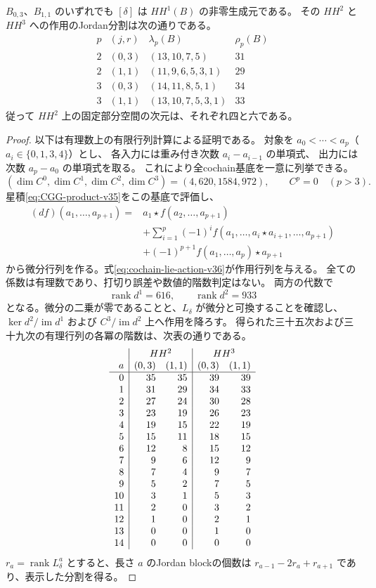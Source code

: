 \begin{proposition}[量子VK成分のHochschild作用]
\label{prop:vk-HH-action-v36}
$B_{0,3}$、$B_{1,1}$ のいずれでも $[\delta]$ は $HH^1(B)$ の非零生成元である。
その $HH^2$ と $HH^3$ への作用のJordan分割は次の通りである。
\[
\begin{array}{c|c|c|r}
 p&(j,r)&\lambda_p(B)&\rho_p(B)\\\hline
 2&(0,3)&(13,10,7,5)&31\\
 2&(1,1)&(11,9,6,5,3,1)&29\\
 3&(0,3)&(14,11,8,5,1)&34\\
 3&(1,1)&(13,10,7,5,3,1)&33
\end{array}
\]
従って $HH^2$ 上の固定部分空間の次元は、それぞれ四と六である。
\end{proposition}

\begin{proof}
以下は有理数上の有限行列計算による証明である。
対象を $a_0<\cdots<a_p$（$a_i\in\{0,1,3,4\}$）とし、
各入力には重み付き次数 $a_i-a_{i-1}$ の単項式、
出力には次数 $a_p-a_0$ の単項式を取る。
これにより全cochain基底を一意に列挙できる。
\[
 (\dim C^0,\dim C^1,\dim C^2,\dim C^3)=(4,620,1584,972),
 \qquad C^p=0\quad(p>3).
\]
星積\eqref{eq:CGG-product-v35}をこの基底で評価し、
\[
\begin{split}
 (df)(a_1,\ldots,a_{p+1})={}&a_1\star f(a_2,\ldots,a_{p+1})\\
 &+\sum_{i=1}^p(-1)^i
 f(a_1,\ldots,a_i\star a_{i+1},\ldots,a_{p+1})\\
 &+(-1)^{p+1}f(a_1,\ldots,a_p)\star a_{p+1}
\end{split}
\]
から微分行列を作る。式\eqref{eq:cochain-lie-action-v36}が作用行列を与える。
全ての係数は有理数であり、打切り誤差や数値的階数判定はない。
両方の代数で
\[
 \operatorname{rank}d^1=616,\qquad
 \operatorname{rank}d^2=933
\]
となる。微分の二乗が零であることと、$L_\delta$ が微分と可換することを確認し、
$\ker d^2/\operatorname{im}d^1$ および $C^3/\operatorname{im}d^2$ 上へ作用を降ろす。
得られた三十五次および三十九次の有理行列の各冪の階数は、次表の通りである。
\[
\begin{array}{r|rr|rr}
 &\multicolumn{2}{c|}{HH^2}&\multicolumn{2}{c}{HH^3}\\
 a &(0,3)&(1,1)&(0,3)&(1,1)\\\hline
0&35&35&39&39\\
1&31&29&34&33\\
2&27&24&30&28\\
3&23&19&26&23\\
4&19&15&22&19\\
5&15&11&18&15\\
6&12&8&15&12\\
7&9&6&12&9\\
8&7&4&9&7\\
9&5&2&7&5\\
10&3&1&5&3\\
11&2&0&3&2\\
12&1&0&2&1\\
13&0&0&1&0\\
14&0&0&0&0\\
\end{array}
\]
$r_a=\operatorname{rank}L_\delta^a$ とすると、長さ $a$ のJordan blockの個数は
$r_{a-1}-2r_a+r_{a+1}$ であり、表示した分割を得る。


\end{proof}
